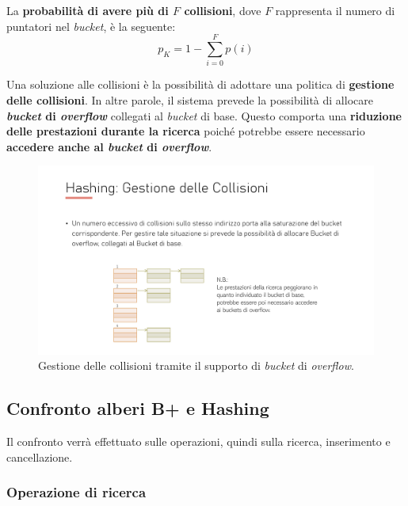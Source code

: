 \documentclass[a4paper]{article}
\begin{document}
	\noindent
	La \textbf{probabilità di avere più di $F$ collisioni}, dove $F$ rappresenta il numero di puntatori nel \emph{bucket}, è la seguente:
	\begin{equation*}
		p_{K} = 1 - \displaystyle\sum_{i=0}^{F} p\left(i\right)
	\end{equation*}\newpage

	\noindent
	Una soluzione alle collisioni è la possibilità di adottare una politica di \textcolor{Red3}{\textbf{gestione delle collisioni}}. In altre parole, il sistema prevede la possibilità di allocare \textbf{\emph{bucket} di \emph{overflow}} collegati al \emph{bucket} di base. Questo comporta una \textbf{riduzione delle prestazioni durante la ricerca} poiché potrebbe essere necessario \textbf{accedere anche al \emph{bucket} di \emph{overflow}}.
	\begin{figure}[!htp]
		\centering
		\includegraphics[width=\textwidth]{img/hash-gestione_collisioni.pdf}
		\caption{Gestione delle collisioni tramite il supporto di \emph{bucket} di \emph{overflow}.}
	\end{figure}\newpage
	
	\subsection{Confronto alberi B+ e Hashing}
	
	Il confronto verrà effettuato sulle operazioni, quindi sulla ricerca, inserimento e cancellazione.
	
	\subsubsection[Operazione di ricerca]{\textcolor{Red3}{Operazione di ricerca}}
	
\end{document}

